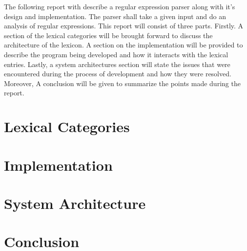 The following report with describe a regular expression parser along with it's design and implementation. The parser shall take a given input and do an analysis of regular expressions. This report will consist of three parts. Firstly. A section of the lexical categories will be brought forward to discuss the architecture of the lexicon. A section on the implementation will be provided to describe the program being developed and how it interacts with the lexical entries. Lastly, a system architectures section will state the issues that were encountered during the process of development and how they were resolved. Moreover, A conclusion will be given to summarize the points made during the report.

\section*{Lexical Categories}


\section*{Implementation}


\section*{System Architecture}



\section*{Conclusion}
